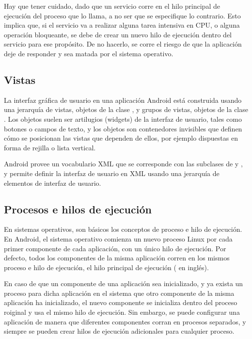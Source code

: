 Hay que tener cuidado, dado que un servicio corre en el hilo principal de ejecución del proceso que lo llama, a no ser que se especifique lo contrario. Esto implica que, si el servicio va a realizar alguna tarea intensiva en CPU, o alguna operación bloqueante, se debe de crear un nuevo hilo de ejecución dentro del servicio para ese propósito. De no hacerlo, se corre el riesgo de que la aplicación deje de responder y sea matada por el sistema operativo.


\subsection{Vistas}

La interfaz gráfica de usuario en una aplicación Android está construida usando una jerarquía de vistas, objetos de la clase , y grupos de vistas, objetos de la clase . Los objetos  suelen ser artilugios (widgets) de la interfaz de usuario, tales como botones o campos de texto, y los objetos  son contenedores invisibles que definen cómo se posicionan las vistas que dependen de ellos, por ejemplo dispuestas en forma de rejilla o lista vertical.

Android provee un vocabulario XML que se corresponde con las subclases de  y , y permite definir la interfaz de usuario en XML usando una jerarquía de elementos de interfaz de usuario.

\subsection{Procesos e hilos de ejecución}

En sistemas operativos, son básicos los conceptos de proceso e hilo de ejecución. En Android, el sistema operativo comienza un nuevo proceso Linux por cada primer componente de cada aplicación, con un único hilo de ejecución. Por defecto, todos los componentes de la misma aplicación corren en los mismos proceso e hilo de ejecución, el hilo principal de ejecución ( en inglés). 

En caso de que un componente de una aplicación sea inicializado, y ya exista un proceso para dicha aplicación en el sistema que otro componente de la misma aplicación ha inicializado, el nuevo componente se inicializa dentro del proceso roiginal y usa el mismo hilo de ejecución. Sin embargo, se puede configurar una aplicación de manera que diferentes componentes corran en procesos separados, y siempre se pueden crear hilos de ejecución adicionales para cualquier proceso.

